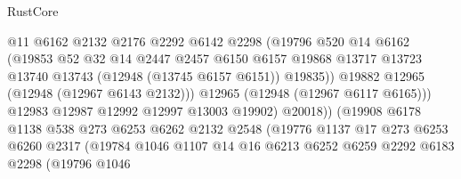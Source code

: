 \begin{lexlean}{RustCore}
\begin{coremodule}
                                  @11
                                  @6162
                                  @2132
                                  @2176
                                  @2292
                                  @6142
                                  @2298
                                  (@19796
                                    @520
                                    @14
                                    @6162
                                    (@19853
                                      @52
                                      @32
                                      @14
                                      @2447
                                      @2457
                                      @6150
                                      @6157
                                      @19868
                                      @13717
                                      @13723
                                      @13740
                                      @13743
                                      (@12948 (@13745 @6157 @6151))
                                      @19835))
                                  @19882
                                  @12965
                                  (@12948 (@12967 @6143 @2132)))
                                @12965
                                (@12948 (@12967 @6117 @6165)))
                              @12983
                              @12987
                              @12992
                              @12997
                              @13003
                              @19902)
                            @20018))
                        (@19908
                          @6178
                          @1138
                          @538
                          @273
                          @6253
                          @6262
                          @2132
                          @2548
                          (@19776
                            @1137
                            @17
                            @273
                            @6253
                            @6260
                            @2317
                            (@19784
                              @1046
                              @1107
                              @14
                              @16
                              @6213
                              @6252
                              @6259
                              @2292
                              @6183
                              @2298
                              (@19796
                                @1046

\end{coremodule}
\end{lexlean}
